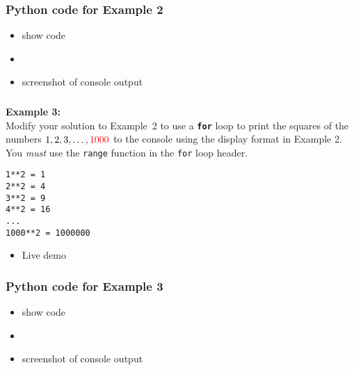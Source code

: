 \documentclass[english,14pt]{beamer}
\newcommand\red[1]{{\color{red} #1}}
\begin{document}

\begin{frame}[fragile]

\frametitle{Python code for Example 2}

\begin{itemize}
	\item show code
	\item[]
	\item screenshot of console output
\end{itemize}
\end{frame}


\begin{frame}[fragile]

\frametitle{}

\frametitle{}

\textbf{Example 3:}\\
\vspace*{5mm}
Modify your solution to Example~2 to use a \textbf{\texttt{for}} loop to print the squares of the numbers $1, 2, 3, \ldots, \red{1000}$ to the console using the display format in Example 2. You \emph{must} use the \texttt{range} function in the \texttt{for} loop header.
\begin{verbatim}
1**2 = 1
2**2 = 4
3**2 = 9
4**2 = 16
...
1000**2 = 1000000
\end{verbatim}

\begin{itemize}
	\item Live demo
\end{itemize}
	
\end{frame}


\begin{frame}[fragile]

\frametitle{Python code for Example 3}

\begin{itemize}
	\item show code
	\item[]
	\item screenshot of console output
\end{itemize}
\end{frame}

\end{document}
